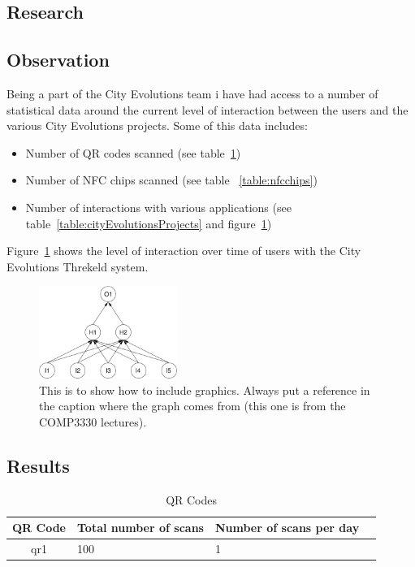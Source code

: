 \documentclass[a4,12pt]{article}
\begin{document}
\subsection{Research}
\subsection{Observation}
Being a part of the City Evolutions team i have had access to a number of statistical data around the current level of interaction between the users and the various City Evolutions projects. Some of this data includes:
\begin{itemize}
    \item{Number of QR codes scanned (see table~\ref{table:qrcodes})}
    \item{Number of NFC chips scanned (see table ~\ref{table:nfcchips})}
    \item{Number of interactions with various applications (see table~\ref{table:cityEvolutionsProjects} and figure~\ref{fig:nn1})}
\end{itemize}
Figure~\ref{fig:nn1} shows the level of interaction over time of users with the City Evolutions Threkeld system.
\begin{figure}[htbp]
\begin{center}
    \leavevmode
    \includegraphics[width=45mm]{figure.pdf}
\caption{This is to show how to include graphics. Always put a reference in the caption where the graph comes from (this one is from the COMP3330 lectures).}
\label{fig:nn1}
\end{center}
\end{figure}

\subsection{Results}
\begin{table}[h!]
    \begin{center}
        \leavevmode
        \begin{tabular}{|cll|l|}\hline
            QR Code & Total number of scans & Number of scans per day\\[0.1cm]\hline
            qr1 & 100 & 1\\\hline
        \end{tabular}
    \end{center}
    \caption{QR Codes}
    \label{table:qrcodes}
\end{table}
\end{document}
